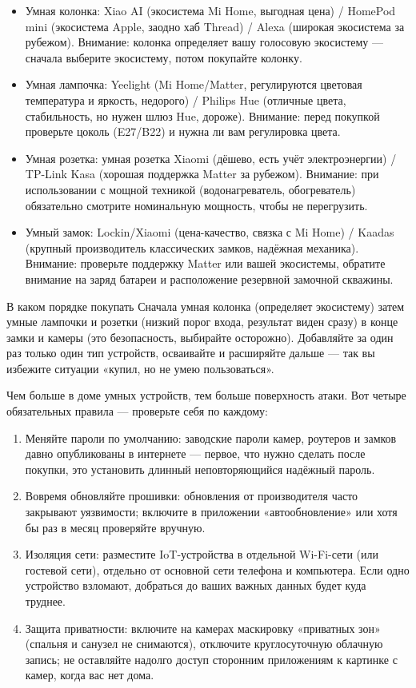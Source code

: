 \begin{itemize}
  \item Умная колонка: Xiao AI (экосистема Mi Home, выгодная цена) / HomePod mini (экосистема Apple, заодно хаб Thread) / Alexa (широкая экосистема за рубежом). Внимание: колонка определяет вашу голосовую экосистему — сначала выберите экосистему, потом покупайте колонку.
  \item Умная лампочка: Yeelight (Mi Home/Matter, регулируются цветовая температура и яркость, недорого) / Philips Hue (отличные цвета, стабильность, но нужен шлюз Hue, дороже). Внимание: перед покупкой проверьте цоколь (E27/B22) и нужна ли вам регулировка цвета.
  \item Умная розетка: умная розетка Xiaomi (дёшево, есть учёт электроэнергии) / TP-Link Kasa (хорошая поддержка Matter за рубежом). Внимание: при использовании с мощной техникой (водонагреватель, обогреватель) обязательно смотрите номинальную мощность, чтобы не перегрузить.
  \item Умный замок: Lockin/Xiaomi (цена-качество, связка с Mi Home) / Kaadas (крупный производитель классических замков, надёжная механика). Внимание: проверьте поддержку Matter или вашей экосистемы, обратите внимание на заряд батареи и расположение резервной замочной скважины.
\end{itemize}

\begin{tcbinfo}{В каком порядке покупать}
Сначала умная колонка (определяет экосистему) затем умные лампочки и розетки (низкий порог входа, результат виден сразу) в конце замки и камеры (это безопасность, выбирайте осторожно). Добавляйте за один раз только один тип устройств, осваивайте и расширяйте дальше — так вы избежите ситуации «купил, но не умею пользоваться».

\end{tcbinfo}


Чем больше в доме умных устройств, тем больше поверхность атаки. Вот четыре обязательных правила — проверьте себя по каждому:

\begin{enumerate}
  \item Меняйте пароли по умолчанию: заводские пароли камер, роутеров и замков давно опубликованы в интернете — первое, что нужно сделать после покупки, это установить длинный неповторяющийся надёжный пароль.
  \item Вовремя обновляйте прошивки: обновления от производителя часто закрывают уязвимости; включите в приложении «автообновление» или хотя бы раз в месяц проверяйте вручную.
  \item Изоляция сети: разместите IoT-устройства в отдельной Wi-Fi-сети (или гостевой сети), отдельно от основной сети телефона и компьютера. Если одно устройство взломают, добраться до ваших важных данных будет куда труднее.
  \item Защита приватности: включите на камерах маскировку «приватных зон» (спальня и санузел не снимаются), отключите круглосуточную облачную запись; не оставляйте надолго доступ сторонним приложениям к картинке с камер, когда вас нет дома.
\end{enumerate}

